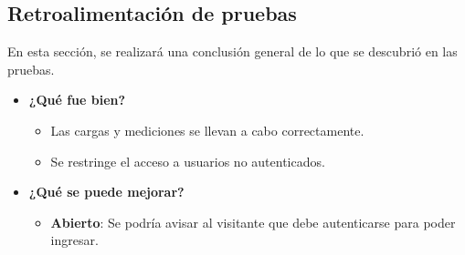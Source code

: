 \subsection{Retroalimentación de pruebas}
En esta sección, se realizará una conclusión general de lo que se descubrió en las pruebas.

	\begin{itemize}
		\item \textbf{¿Qué fue bien?}
        	\begin{itemize}
				\item Las cargas y mediciones se llevan a cabo correctamente.
				\item Se restringe el acceso a usuarios no autenticados.
			\end{itemize}
   		\item \textbf{¿Qué se puede mejorar?}
        	\begin{itemize}
		        \item \textbf{Abierto}: Se podría avisar al visitante que debe autenticarse para poder ingresar.
            \end{itemize}
        

	\end{itemize}